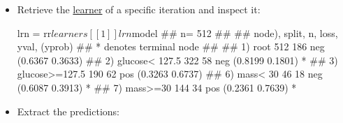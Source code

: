 \documentclass[]{article}
\newenvironment{Shaded}{}{}
\newcommand{\DecValTok}[1]{#1}
\newcommand{\KeywordTok}[1]{\textcolor[rgb]{0.00,0.00,1.00}{#1}}
\newcommand{\NormalTok}[1]{#1}
\newcommand{\OperatorTok}[1]{#1}
\newcommand{\StringTok}[1]{\textcolor[rgb]{0.00,0.50,0.50}{#1}}
\renewenvironment{Shaded} {\begin{snugshade}\small} {\end{snugshade}}
\begin{document}
\begin{itemize}
\begin{Shaded}
\end{Shaded}
\item
  Retrieve the \protect\hyperlink{learners}{learner} of a specific iteration and inspect it:

\begin{Shaded}
\begin{Highlighting}[]
\NormalTok{lrn =}\StringTok{ }\NormalTok{rr}\OperatorTok{$}\NormalTok{learners[[}\DecValTok{1}\NormalTok{]]}
\NormalTok{lrn}\OperatorTok{$}\NormalTok{model}
\NormalTok{## n= 512 }
\NormalTok{## }
\NormalTok{## node), split, n, loss, yval, (yprob)}
\NormalTok{##       * denotes terminal node}
\NormalTok{## }
\NormalTok{## 1) root 512 186 neg (0.6367 0.3633)  }
\NormalTok{##   2) glucose< 127.5 322  58 neg (0.8199 0.1801) *}
\NormalTok{##   3) glucose>=127.5 190  62 pos (0.3263 0.6737)  }
\NormalTok{##     6) mass< 30 46  18 neg (0.6087 0.3913) *}
\NormalTok{##     7) mass>=30 144  34 pos (0.2361 0.7639) *}
\end{Highlighting}
\end{Shaded}
\item
  Extract the predictions:


\end{itemize}
\end{document}
